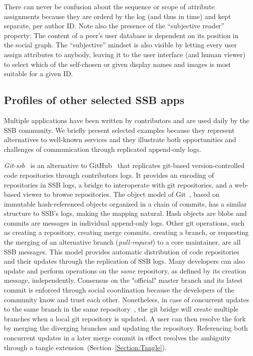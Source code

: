 \documentclass[sigconf]{acmart}
\begin{document}
There can never be confusion about the sequence or scope of attribute
assignments because they are orderd by the log (and thus in time) and
kept separate, per author ID. Note also the presence of the
``subjective reader'' property: The content of a peer's user database
is dependent on its position in the social graph. The ``subjective''
mindset is also visible by letting every user assign attributes to
anybody, leaving it to the user interface (and human viewer) to select
which of the self-chosen or given display names and images is most suitable
for a given ID.

\subsection{Profiles of other selected SSB apps}
\label{Section:AppProfiles}

Multiple applications have been written by contributors and are used daily by
the SSB community. We briefly present selected examples because they represent
alternatives to well-known services and they illustrate both opportunities and
challenges of communication through replicated append-only logs.

\textit{Git-ssb}~\cite{git-ssb} is an alternative to GitHub~\cite{github} that
replicates git-based version-controlled code repositories through contributors
logs. It provides an encoding of repositories in SSB logs, a bridge to
interoperate with git repositories, and a web-based viewer to browse
repositories. The object model of Git~\cite{chacon2014pro}, based on immutable
hash-referenced objects organized in a chain of commits, has a similar
structure to SSB's logs, making the mapping natural. Hash objects are blobs and
commits are messages in individual append-only logs.  Other git operations,
such as creating a repository, creating merge commits, creating a branch, or
requesting the merging of an alternative branch (\textit{pull-request}) to a
core maintainer, are all SSB messages. This model provides automatic
distribution of code repositories and their updates through the replication of
SSB logs. Many developers can also update and perform operations on the
\textit{same} repository, as defined by its creation message, independently.
Consensus on the "official" master branch and its latest commit is enforced
through social coordination because the developers of the community know and
trust each other. Nonetheless, in case of concurrent updates to the same branch
in the same repository~\cite{git-ssb-push-conflict}, the git bridge will create
multiple branches when a local git repository is updated. A user can then
resolve the fork by merging the diverging branches and updating the repository.
Referencing both concurrent updates in a later merge commit in effect resolves
the ambiguity through a tangle extension~(Section~\ref{Section:Tangle}).
\end{document}
